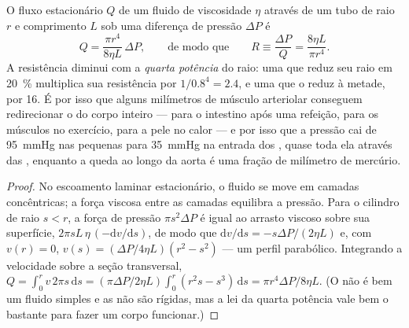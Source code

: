 \begin{theorem}\label{thm:b2:blood-circulation:poiseuille}
O fluxo estacionário $Q$ de um fluido de viscosidade $\eta$ através de
um tubo de raio $r$ e comprimento $L$ sob uma diferença de pressão
$\Delta P$ é
\[
Q = \frac{\pi r^{4}}{8\eta L}\,\Delta P, \qquad \text{de modo que}\qquad
R \equiv \frac{\Delta P}{Q} = \frac{8\eta L}{\pi r^{4}} .
\]
A resistência diminui com a \emph{quarta potência} do raio: uma
 que reduz seu raio em \qty{20}{\%} multiplica sua resistência
por $1/0.8^{4} = 2.4$, e uma que o reduz à metade, por 16. É por isso
que alguns milímetros de músculo arteriolar conseguem redirecionar o
 do corpo inteiro --- para o intestino após uma refeição, para os
músculos no exercício, para a pele no calor --- e por isso que a pressão
cai de \qty{95}{mmHg} nas pequenas  para \qty{35}{mmHg} na
entrada dos , quase toda ela através das , enquanto
a queda ao longo da aorta é uma fração de milímetro de mercúrio.
\end{theorem}
\begin{proof}
No escoamento laminar estacionário, o fluido se move em camadas
concêntricas; a força viscosa entre as camadas equilibra a pressão.
Para o cilindro de raio $s < r$, a força de pressão $\pi s^{2}\Delta P$
é igual ao arrasto viscoso sobre sua superfície,
$2\pi s L\,\eta\,(-\mathrm{d}v/
\mathrm{d}s)$, de modo que $\mathrm{d}v/\mathrm{d}s = -s\Delta P/(2\eta L)$
e, com $v(r) = 0$, $v(s) = (\Delta P/4\eta L)(r^{2} - s^{2})$ --- um
perfil parabólico. Integrando a velocidade sobre a seção transversal,
$Q = \int_{0}^{r} v\,2\pi s\,\mathrm{d}s = (\pi\Delta P/2\eta L)
\int_{0}^{r}(r^{2}s - s^{3})\,\mathrm{d}s = \pi r^{4}\Delta P/8\eta
L$. (O  não é bem um fluido simples e as  não são
rígidas, mas a lei da quarta potência vale bem o bastante para fazer um
corpo funcionar.)
\end{proof}

